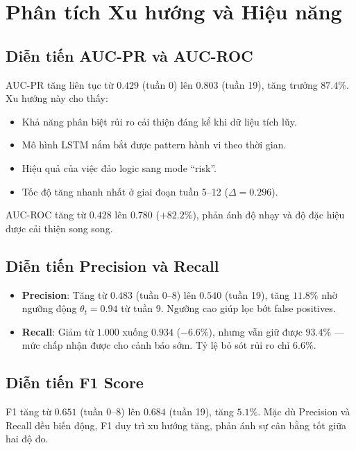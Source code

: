 \documentclass[12pt,a4paper]{article}
\begin{document}
\section{Phân tích Xu hướng và Hiệu năng}

\subsection{Diễn tiến AUC-PR và AUC-ROC}

AUC-PR tăng liên tục từ $0.429$ (tuần 0) lên $0.803$ (tuần 19), tăng trưởng $87.4\%$. Xu hướng này cho thấy:

\begin{itemize}
    \item Khả năng phân biệt rủi ro cải thiện đáng kể khi dữ liệu tích lũy.
    \item Mô hình LSTM nắm bắt được pattern hành vi theo thời gian.
    \item Hiệu quả của việc đảo logic sang mode ``risk''.
    \item Tốc độ tăng nhanh nhất ở giai đoạn tuần 5--12 ($\Delta = 0.296$).
\end{itemize}

AUC-ROC tăng từ $0.428$ lên $0.780$ ($+82.2\%$), phản ánh độ nhạy và độ đặc hiệu được cải thiện song song.

\subsection{Diễn tiến Precision và Recall}

\begin{itemize}
    \item \textbf{Precision}: Tăng từ $0.483$ (tuần 0--8) lên $0.540$ (tuần 19), tăng $11.8\%$ nhờ ngưỡng động $\theta_t = 0.94$ từ tuần 9. Ngưỡng cao giúp lọc bớt false positives.
    \item \textbf{Recall}: Giảm từ $1.000$ xuống $0.934$ ($-6.6\%$), nhưng vẫn giữ được $93.4\%$ --- mức chấp nhận được cho cảnh báo sớm. Tỷ lệ bỏ sót rủi ro chỉ $6.6\%$.
\end{itemize}

\subsection{Diễn tiến F1 Score}

F1 tăng từ $0.651$ (tuần 0--8) lên $0.684$ (tuần 19), tăng $5.1\%$. Mặc dù Precision và Recall đều biến động, F1 duy trì xu hướng tăng, phản ánh sự cân bằng tốt giữa hai độ đo.
\end{document}
